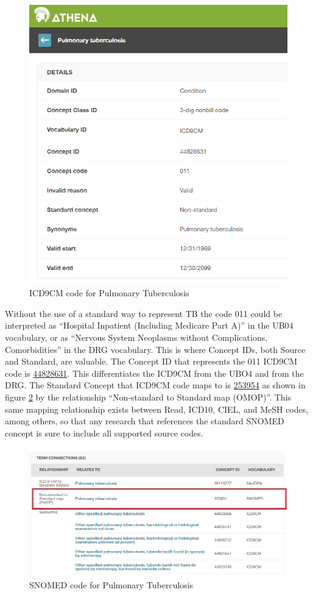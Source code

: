 \documentclass[11pt]{book}
\begin{document}
\begin{figure}

{\centering \includegraphics[width=0.75\linewidth]{images/CommonDataModel/pulmTubICD9} 

}

\caption{ICD9CM code for Pulmonary Tuberculosis}\label{fig:pulmTubICD9}
\end{figure}

Without the use of a standard way to represent TB the code 011 could be
interpreted as ``Hospital Inpatient (Including Medicare Part A)'' in the
UB04 vocabulary, or as ``Nervous System Neoplasms without Complications,
Comorbidities'' in the DRG vocabulary. This is where Concept IDs, both
Source and Standard, are valuable. The Concept ID that represents the
011 ICD9CM code is
\href{http://athena.ohdsi.org/search-terms/terms/44828631}{44828631}.
This differentiates the ICD9CM from the UBO4 and from the DRG. The
Standard Concept that ICD9CM code maps to is
\href{http://athena.ohdsi.org/search-terms/terms/253954}{253954} as
shown in figure \ref{fig:pulmTubMap} by the relationship ``Non-standard
to Standard map (OMOP)''. This same mapping relationship exists between
Read, ICD10, CIEL, and MeSH codes, among others, so that any research
that references the standard SNOMED concept is sure to include all
supported source codes.

\begin{figure}
\includegraphics[width=1\linewidth]{images/CommonDataModel/pulmTubMap} \caption{SNOMED code for Pulmonary Tuberculosis}\label{fig:pulmTubMap}
\end{figure}
\end{document}
